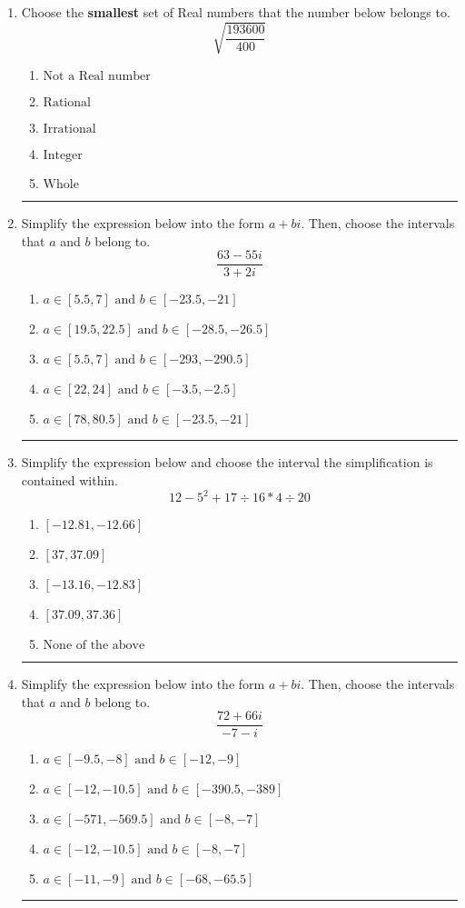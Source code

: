 \documentclass[14pt]{extbook}
\newcommand{\litem}[1]{\item#1\hspace*{-1cm}\rule{\textwidth}{0.4pt}}
\begin{document}
\begin{enumerate}
{\begin{enumerate}[label=\Alph*.]
\end{enumerate} }
\litem{
Choose the \textbf{smallest} set of Real numbers that the number below belongs to.\[ \sqrt{\frac{193600}{400}} \]\begin{enumerate}[label=\Alph*.]
\item \( \text{Not a Real number} \)
\item \( \text{Rational} \)
\item \( \text{Irrational} \)
\item \( \text{Integer} \)
\item \( \text{Whole} \)

\end{enumerate} }
\litem{
Simplify the expression below into the form $a+bi$. Then, choose the intervals that $a$ and $b$ belong to.\[ \frac{63 - 55 i}{3 + 2 i} \]\begin{enumerate}[label=\Alph*.]
\item \( a \in [5.5, 7] \text{ and } b \in [-23.5, -21] \)
\item \( a \in [19.5, 22.5] \text{ and } b \in [-28.5, -26.5] \)
\item \( a \in [5.5, 7] \text{ and } b \in [-293, -290.5] \)
\item \( a \in [22, 24] \text{ and } b \in [-3.5, -2.5] \)
\item \( a \in [78, 80.5] \text{ and } b \in [-23.5, -21] \)

\end{enumerate} }
\litem{
Simplify the expression below and choose the interval the simplification is contained within.\[ 12 - 5^2 + 17 \div 16 * 4 \div 20 \]\begin{enumerate}[label=\Alph*.]
\item \( [-12.81, -12.66] \)
\item \( [37, 37.09] \)
\item \( [-13.16, -12.83] \)
\item \( [37.09, 37.36] \)
\item \( \text{None of the above} \)

\end{enumerate} }
\litem{
Simplify the expression below into the form $a+bi$. Then, choose the intervals that $a$ and $b$ belong to.\[ \frac{72 + 66 i}{-7 - i} \]\begin{enumerate}[label=\Alph*.]
\item \( a \in [-9.5, -8] \text{ and } b \in [-12, -9] \)
\item \( a \in [-12, -10.5] \text{ and } b \in [-390.5, -389] \)
\item \( a \in [-571, -569.5] \text{ and } b \in [-8, -7] \)
\item \( a \in [-12, -10.5] \text{ and } b \in [-8, -7] \)
\item \( a \in [-11, -9] \text{ and } b \in [-68, -65.5] \)


\end{enumerate}}
\end{enumerate}
\end{document}
